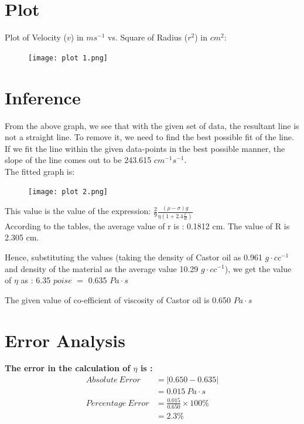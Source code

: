 \documentclass{article}
\begin{document}
	\pagebreak

	\section{Plot}
	
	Plot of Velocity ($v$) in $ms^{-1}$ vs. Square of Radius ($r^{2}$) in $cm^{2}$:
	\begin{figure}[H]
		\centering
		\texttt{[image: plot 1.png]}
	\end{figure}

	\section{Inference}
	
	From the above graph, we see that with the given set of data, the resultant line is not a 
	straight line. To remove it, we need to find the best possible fit of the line. If we fit the line 
	within the given data-points in the best possible manner, the slope of the line comes out to be 243.615 $cm^{-1}s^{-1}$.\\
	The fitted graph is:
	
	\begin{figure}[H]
		\centering
		\texttt{[image: plot 2.png]}
	\end{figure}

	This value is the value of the expression: $\frac{2}{9} \frac{(\rho - \sigma)g}{\eta \left(1 + 2.4 \frac{r}{R}\right)}$\\
	
	According to the tables, the average value of r is : 0.1812 cm. The value of R is 2.305 cm. 
	
	Hence, substituting the values (taking the density of Castor oil as 0.961 $g \cdot cc^{-1}$ and density of 
	the material as the average value 10.29 $g \cdot cc^{-1}$), we get the value of $\eta$ as : 6.35 $poise$ $=$ 0.635 $Pa \cdot s$
	
	The given value of co-efficient of viscosity of Castor oil is 0.650 $Pa \cdot s$
	
	\section{Error Analysis}
	
	\textbf{The error in the calculation of $\eta$ is :} 
	\begin{align*}
		Absolute\ Error &= |0.650 - 0.635|\\
		&= 0.015\ Pa \cdot s\\
		Percentage\ Error &= \frac{0.015}{0.650} \times 100 \%\\
		&= 2.3 \%
	\end{align*}
\end{document}
